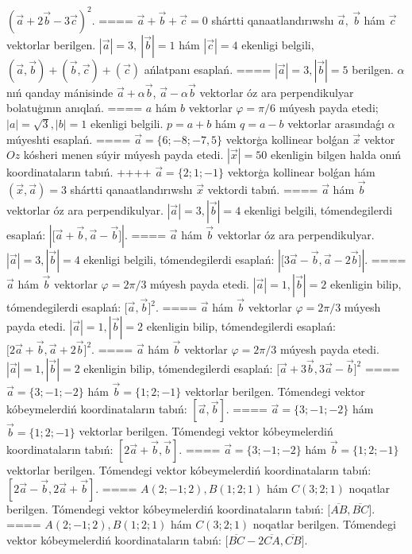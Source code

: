 $ (\vec{a} + 2\vec{b} - 3\vec{c}) ^{2}$.
====
$\vec{a} + \vec{b} + \vec{c} = 0$ shártti qanaatlandırıwshı $\vec{a},\ \vec{b}$ hám $\vec{c}$ vektorlar berilgen. $|\vec{a}| = 3,\ |\vec{b}| = 1$ hám $|\vec{c}| = 4$ ekenligi belgili, $\left(\vec{a},\vec{b} \right) + \left(\vec{b},\vec{c} \right) + (\vec{c}) $ ańlatpanı esaplań.
====
$|\vec{a}| = 3,|\vec{b}| = 5$ berilgen. $\alpha$ nıń qanday mánisinde $\vec{a} + \alpha\vec{b}$, $\vec{a} - \alpha\vec{b}$ vektorlar óz ara perpendikulyar bolatuģının anıqlań.
====
$a$ hám $b$ vektorlar $\varphi = \pi/6$ múyesh payda etedi; $|a| = \sqrt{3},|b| = 1$ ekenligi belgili. $p = a + b$ hám $q = a - b$ vektorlar arasındaǵı $\alpha$ múyeshti esaplań.
====
$\vec{a} = \{ 6; - 8; - 7,5\}$ vektorģa kollinear bolǵan $\vec{x}$ vektor $Oz$ kósheri menen súyir múyesh payda etedi. $|\vec{x}| = 50$ ekenligin bilgen halda onıń koordinataların tabıń.
++++
$\vec{a} = \{ 2;1; - 1\}$ vektorģa kollinear bolǵan hám $\left(\vec{x},\vec{a} \right) = 3$ shártti qanaatlandırıwshı $\vec{x}$ vektordi tabıń.
====
$\vec{a}$ hám $\vec{b}$ vektorlar óz ara perpendikulyar. $|\vec{a}| = 3,|\vec{b}| = 4$ ekenligi belgili, tómendegilerdi esaplań:
$|\lbrack\vec{a} + \vec{b},\vec{a} - \vec{b}\rbrack|$.
====
$\vec{a}$ hám $\vec{b}$ vektorlar óz ara perpendikulyar. $|\vec{a}| = 3,|\vec{b}| = 4$ ekenligi belgili, tómendegilerdi esaplań:
$|\lbrack 3\vec{a} - \vec{b},\vec{a}-2\vec{b}\rbrack|$.
====
$\vec{a}$ hám $\vec{b}$ vektorlar $\varphi = 2\pi/3$ múyesh payda etedi. $|\vec{a}| = 1,|\vec{b}| = 2$ ekenligin bilip, tómendegilerdi esaplań:
$\lbrack\vec{a},\vec{b}\rbrack^{2}$.
====
$\vec{a}$ hám $\vec{b}$ vektorlar $\varphi = 2\pi/3$ múyesh payda etedi. $|\vec{a}| = 1,|\vec{b}| = 2$ ekenligin bilip, tómendegilerdi esaplań:
$\lbrack 2\overrightarrow{a} + \overrightarrow{b},\overrightarrow{a} + 2\overrightarrow{b}\rbrack^{2}$.
====
$\vec{a}$ hám $\vec{b}$ vektorlar $\varphi = 2\pi/3$ múyesh payda etedi. $|\vec{a}| = 1,|\vec{b}| = 2$ ekenligin bilip, tómendegilerdi esaplań:
$\lbrack\overrightarrow{a} + 3\overrightarrow{b},3\overrightarrow{a} - \overrightarrow{b}\rbrack^{2}$
====
$\vec{a} = \{ 3; - 1; - 2\}$ hám $\vec{b} = \{ 1;2; - 1\}$ vektorlar berilgen. Tómendegi vektor kóbeymelerdiń koordinataların tabıń:
$\left\lbrack \vec{a},\vec{b} \right\rbrack$.
====
$\vec{a} = \{ 3; - 1; - 2\}$ hám $\vec{b} = \{ 1;2; - 1\}$ vektorlar berilgen. Tómendegi vektor kóbeymelerdiń koordinataların tabıń:
$\left\lbrack 2\vec{a} + \vec{b},\vec{b} \right\rbrack$.
====
$\vec{a} = \{ 3; - 1; - 2\}$ hám $\vec{b} = \{ 1;2; - 1\}$ vektorlar berilgen. Tómendegi vektor kóbeymelerdiń koordinataların tabıń:
$\left\lbrack 2\vec{a} - \vec{b},2\vec{a} + \vec{b} \right\rbrack$.
====
$A (2; -1;2), B (1;2; 1) $ hám $C (3;2;1) $ noqatlar berilgen. Tómendegi vektor kóbeymelerdiń koordinataların tabıń:
$\lbrack\overline{AB},\overline{BC}\rbrack$.
====
$A (2; -1;2), B (1;2; 1) $ hám $C (3;2;1) $ noqatlar berilgen. Tómendegi vektor kóbeymelerdiń koordinataların tabıń:
$\lbrack\overline{BC} - 2\overline{CA},\overline{CB}\rbrack$.